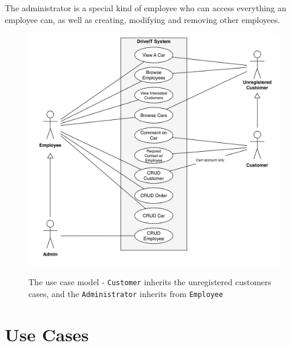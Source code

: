 The administrator is a special kind of employee who can access everything an employee can, as well as creating, modifying and removing other employees.\\

\begin{figure}[h!]
    \centering
        \includegraphics[scale=0.4]{Figures/UseCase-Model}\\
    \caption{The use case model - \texttt{Customer} inherits the unregistered customers cases, and the \texttt{Administrator} inherits from \texttt{Employee}}
  \label{fig:UseCaseModel}
\end{figure}

\section{Use Cases}



%

%






